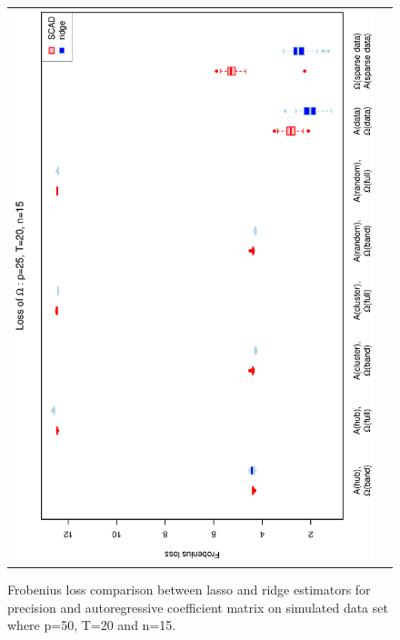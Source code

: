 \documentclass[a4paper]{article}
\begin{document}
\begin{figure}[h!]
\begin{tabular}{cc}
\includegraphics[scale=0.5,angle=270]{LossOmega25T20N15.eps}\\
\end{tabular}
\caption{Frobenius loss comparison between lasso and ridge estimators for precision and autoregressive coefficient matrix on simulated data set where p=50, T=20 and n=15.}
\label{fig:Loss25T20N15}
\end{figure}
\end{document}
